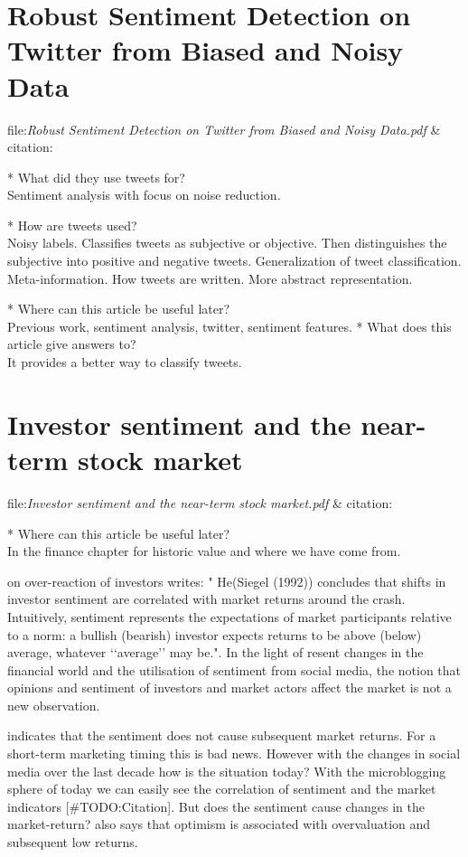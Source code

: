 \section{Robust Sentiment Detection on Twitter from Biased and Noisy Data}
file:\textit{Robust Sentiment Detection on Twitter from Biased and Noisy
Data.pdf} & citation:\cite[]{barbosa10}

* What did they use tweets for?\\
Sentiment analysis with focus on noise reduction. 

* How are tweets used?\\
Noisy labels. Classifies tweets as subjective or objective. Then distinguishes
the subjective into positive and negative tweets.  
Generalization of tweet classification. Meta-information. How tweets are
written. More abstract representation.

* Where can this article be useful later? \\
Previous work, sentiment analysis, twitter, sentiment features. 
* What does this article give answers to?\\
It provides a better way to classify tweets. 

\section{Investor sentiment and the near-term stock market}
file:\textit{Investor sentiment and the near-term stock market.pdf} & citation:\cite[]{Brown20041}

* Where can this article be useful later? \\
In the finance chapter for historic value and where we have come from. 

\cite[p2]{brown20041} on over-reaction of investors writes: "
He(Siegel (1992)) concludes that shifts in investor sentiment are correlated with market
returns around the crash. Intuitively, sentiment represents the expectations of market participants
relative to a norm: a bullish (bearish) investor expects returns to be above
(below) average, whatever ‘‘average’’ may be.". In the light of resent changes
in the financial world and the utilisation of sentiment from social media, the
notion that opinions and sentiment of investors and market actors affect the
market is not a new observation. 

\cite[p3]{Brown20041} indicates that the sentiment does not cause subsequent
market returns. For a short-term marketing timing this is bad news. However
with the changes in social media over the last decade how is the situation
today? With the microblogging sphere of today we can easily see the
correlation of sentiment and the market indicators [#TODO:Citation]. But
does the sentiment cause changes in the market-return? 
\cite[p3]{Brown20041} also says that optimism is associated with overvaluation and subsequent low returns.

